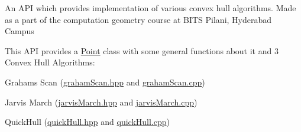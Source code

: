 \label{index_md_Readme}%
%
 An A\+PI which provides implementation of various convex hull algorithms. Made as a part of the computation geometry course at B\+I\+TS Pilani, Hyderabad Campus

This A\+PI provides a \mbox{\hyperlink{class_point}{Point}} class with some general functions about it and 3 Convex Hull Algorithms\+:


\begin{DoxyItemize}
\item Graham\textquotesingle{}s Scan (\mbox{\hyperlink{graham_scan_8hpp}{graham\+Scan.\+hpp}} and \mbox{\hyperlink{graham_scan_8cpp}{graham\+Scan.\+cpp}})
\item Jarvis March (\mbox{\hyperlink{jarvis_march_8hpp}{jarvis\+March.\+hpp}} and \mbox{\hyperlink{jarvis_march_8cpp}{jarvis\+March.\+cpp}})
\item Quick\+Hull (\mbox{\hyperlink{quick_hull_8hpp}{quick\+Hull.\+hpp}} and \mbox{\hyperlink{quick_hull_8cpp}{quick\+Hull.\+cpp}}) 
\end{DoxyItemize}